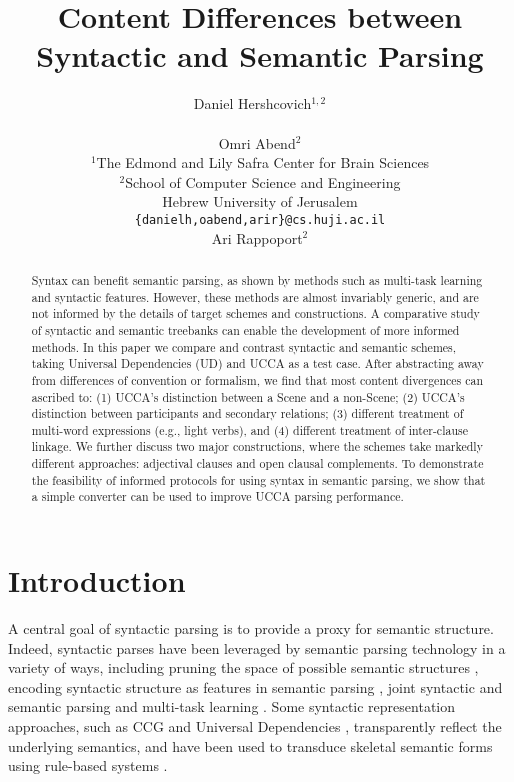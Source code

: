 \documentclass[11pt,a4paper]{article}
\title{Content Differences between Syntactic and Semantic Parsing}
\author{Daniel Hershcovich$^{1,2}$ \\
  \\\And
  Omri Abend$^2$ \\
  $^1$The Edmond and Lily Safra Center for Brain Sciences \\
  $^2$School of Computer Science and Engineering \\
  Hebrew University of Jerusalem \\
  \texttt{\{danielh,oabend,arir\}@cs.huji.ac.il}
  \\\And
  Ari Rappoport$^2$
}
\date{}
\begin{document}
\maketitle

\begin{abstract}
  Syntax can benefit semantic parsing,
  as shown by methods such as multi-task learning and syntactic features.
  However, these methods are almost invariably generic,
  and are not informed by the details of target schemes and constructions.
  A comparative study of syntactic and semantic treebanks can enable
  the development of more informed methods.
  In this paper we compare and contrast syntactic and semantic schemes,
  taking Universal Dependencies (UD) and UCCA as a test case.
  After abstracting away from differences of convention or formalism,
  we find that most content divergences can ascribed to: 
  (1) UCCA's distinction between a Scene and a non-Scene; %
  (2) UCCA's distinction between participants and secondary relations; %
  (3) different treatment of multi-word expressions (e.g., light verbs), and
  (4) different treatment of inter-clause linkage.
  We further discuss two major constructions, where the schemes take markedly different approaches:
  adjectival clauses and open clausal complements.
  To demonstrate the feasibility of informed protocols for using syntax in semantic parsing,
  we show that a simple converter can be used to improve UCCA parsing performance.
\end{abstract}


\section{Introduction}\label{sec:introduction}

  A central goal of syntactic parsing is to provide a proxy for semantic structure.
  Indeed, syntactic parses have been leveraged by semantic parsing technology in a variety of ways,
  including pruning the space of possible semantic structures \cite{xue2004calibrating}, 
  encoding syntactic structure as features in semantic parsing \cite{gildea2002automatic}, 
  joint syntactic and semantic parsing \cite{surdeanu2008conll,hajivc2009conll} and
  multi-task learning \cite{swayamdipta2018syntactic}. 
  Some syntactic representation approaches, such as CCG \cite{Steedman:00} and Universal Dependencies \cite[UD; ][]{nivre2016universal},
  transparently reflect the underlying semantics, and have been used to
  transduce skeletal semantic forms using rule-based systems \cite{Basile:12,white2016universal,reddy2017universal}.
  
\end{document}
